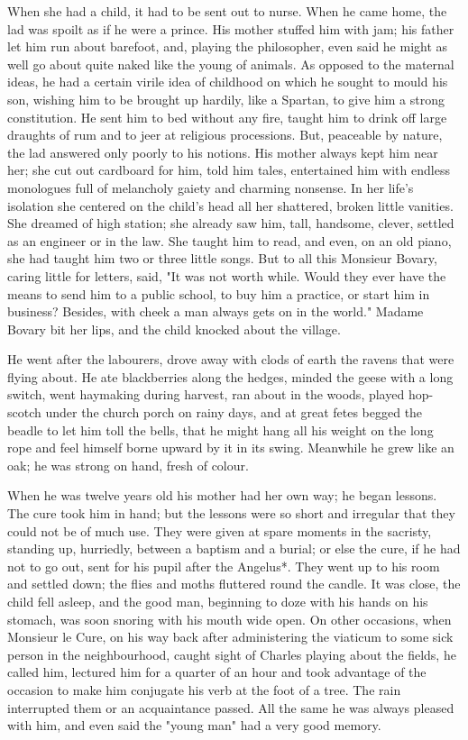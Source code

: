 \documentclass{tufte-book}
\begin{document}
When she had a child, it had to be sent out to nurse. When he came home,
the lad was spoilt as if he were a prince. His mother stuffed him
with jam; his father let him run about barefoot, and, playing the
philosopher, even said he might as well go about quite naked like the
young of animals. As opposed to the maternal ideas, he had a certain
virile idea of childhood on which he sought to mould his son, wishing
him to be brought up hardily, like a Spartan, to give him a strong
constitution. He sent him to bed without any fire, taught him to drink
off large draughts of rum and to jeer at religious processions. But,
peaceable by nature, the lad answered only poorly to his notions. His
mother always kept him near her; she cut out cardboard for him, told him
tales, entertained him with endless monologues full of melancholy gaiety
and charming nonsense. In her life's isolation she centered on the
child's head all her shattered, broken little vanities. She dreamed of
high station; she already saw him, tall, handsome, clever, settled as
an engineer or in the law. She taught him to read, and even, on an old
piano, she had taught him two or three little songs. But to all this
Monsieur Bovary, caring little for letters, said, "It was not worth
while. Would they ever have the means to send him to a public school, to
buy him a practice, or start him in business? Besides, with cheek a man
always gets on in the world." Madame Bovary bit her lips, and the child
knocked about the village.

He went after the labourers, drove away with clods of earth the ravens
that were flying about. He ate blackberries along the hedges, minded the
geese with a long switch, went haymaking during harvest, ran about in
the woods, played hop-scotch under the church porch on rainy days, and
at great fetes begged the beadle to let him toll the bells, that he
might hang all his weight on the long rope and feel himself borne upward
by it in its swing. Meanwhile he grew like an oak; he was strong on
hand, fresh of colour.

When he was twelve years old his mother had her own way; he began
lessons. The cure took him in hand; but the lessons were so short and
irregular that they could not be of much use. They were given at spare
moments in the sacristy, standing up, hurriedly, between a baptism and
a burial; or else the cure, if he had not to go out, sent for his pupil
after the Angelus*. They went up to his room and settled down; the
flies and moths fluttered round the candle. It was close, the child
fell asleep, and the good man, beginning to doze with his hands on his
stomach, was soon snoring with his mouth wide open. On other occasions,
when Monsieur le Cure, on his way back after administering the viaticum
to some sick person in the neighbourhood, caught sight of Charles
playing about the fields, he called him, lectured him for a quarter of
an hour and took advantage of the occasion to make him conjugate his
verb at the foot of a tree. The rain interrupted them or an acquaintance
passed. All the same he was always pleased with him, and even said the
"young man" had a very good memory.
\end{document}
